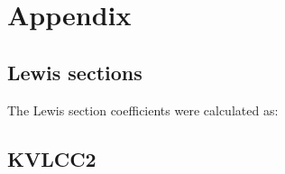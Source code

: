 \section{Appendix}\label{appendix}

    \subsection{Lewis sections}\label{lewis-sections}

    The Lewis section coefficients were calculated as:

    \subsection{KVLCC2}\label{kvlcc2}


    
    
    
